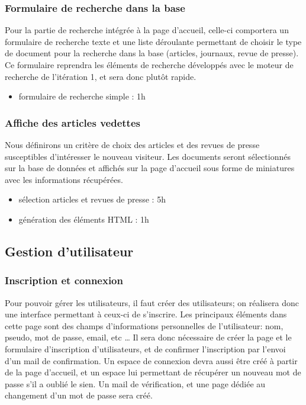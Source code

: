 		\subsubsection{Formulaire de recherche dans la base}
		\label{subsubsec:acc_rech}
			Pour la partie de recherche intégrée à la page d’accueil, celle-ci comportera un formulaire de recherche texte et une liste déroulante permettant de choisir le type de document pour la recherche dans la base (articles, journaux, revue de presse). Ce formulaire reprendra les éléments de recherche développés avec le moteur de recherche de l'itération 1, et sera donc plutôt rapide.

			\begin{itemize}
				\item formulaire de recherche simple : 1h
			\end{itemize}

		\subsubsection{Affiche des articles vedettes} 
		\label{subsubsec:acc_article}
			Nous définirons un critère de choix des articles et des revues de presse susceptibles d'intéresser le nouveau visiteur. Les documents seront sélectionnés sur la base de données et affichés sur la page d'accueil sous forme de miniatures avec les informations récupérées.

			\begin{itemize}
				\item sélection articles et revues de presse : 5h
				\item génération des éléments HTML : 1h
			\end{itemize}

	\subsection{Gestion d'utilisateur}
	\label{subsec:utilisateur}
		\subsubsection{Inscription et connexion}
		\label{subsubsec:util_inscr}
			Pour pouvoir gérer les utilisateurs, il faut créer des utilisateurs; on réalisera donc une interface permettant à ceux-ci de s'inscrire. Les principaux éléments dans cette page sont des champs d’informations personnelles de l’utilisateur: nom, pseudo, mot de passe, email, etc … Il sera donc nécessaire de créer la page et le formulaire d'inscription d'utilisateurs, et de confirmer l'inscription par l'envoi d'un mail de confirmation. Un espace de connexion devra aussi être créé à partir de la page d'accueil, et un espace lui permettant de récupérer un nouveau mot de passe s'il a oublié le sien. Un mail de vérification, et une page dédiée au changement d'un mot de passe sera créé.

